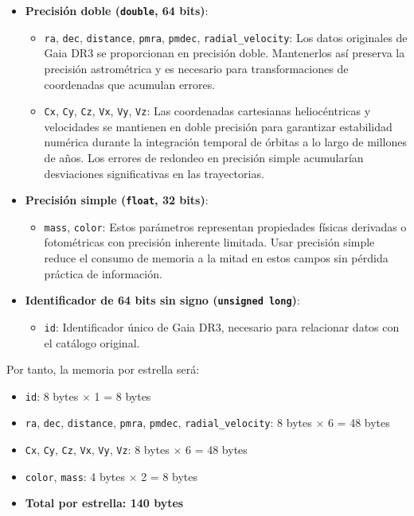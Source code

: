 \begin{itemize}
    \item \textbf{Precisión doble (\texttt{double}, 64 bits)}:
    \begin{itemize}
        \item \texttt{ra}, \texttt{dec}, \texttt{distance}, \texttt{pmra}, \texttt{pmdec}, \texttt{radial\_velocity}: Los datos originales de Gaia DR3 se proporcionan en precisión doble. Mantenerlos así preserva la precisión astrométrica y es necesario para transformaciones de coordenadas que acumulan errores.

        \item \texttt{Cx}, \texttt{Cy}, \texttt{Cz}, \texttt{Vx}, \texttt{Vy}, \texttt{Vz}: Las coordenadas cartesianas heliocéntricas y velocidades se mantienen en doble precisión para garantizar estabilidad numérica durante la integración temporal de órbitas a lo largo de millones de años. Los errores de redondeo en precisión simple acumularían desviaciones significativas en las trayectorias.
    \end{itemize}

    \item \textbf{Precisión simple (\texttt{float}, 32 bits)}:
    \begin{itemize}
        \item \texttt{mass}, \texttt{color}: Estos parámetros representan propiedades físicas derivadas o fotométricas con precisión inherente limitada.
        Usar precisión simple reduce el consumo de memoria a la mitad en estos campos sin pérdida práctica de información.
    \end{itemize}

    \item \textbf{Identificador de 64 bits sin signo (\texttt{unsigned long})}:
    \begin{itemize}
        \item \texttt{id}: Identificador único de Gaia DR3, necesario para relacionar datos con el catálogo original.
    \end{itemize}
\end{itemize}

Por tanto, la memoria por estrella será:
\begin{itemize}
    \item \texttt{id}: 8 bytes $\times$ 1 = 8 bytes
    \item \texttt{ra}, \texttt{dec}, \texttt{distance}, \texttt{pmra}, \texttt{pmdec}, \texttt{radial\_velocity}: 8 bytes $\times$ 6 = 48 bytes
    \item \texttt{Cx}, \texttt{Cy}, \texttt{Cz}, \texttt{Vx}, \texttt{Vy}, \texttt{Vz}: 8 bytes $\times$ 6 = 48 bytes
    \item \texttt{color}, \texttt{mass}: 4 bytes $\times$ 2 = 8 bytes
    \item \textbf{Total por estrella: 140 bytes}
\end{itemize}

